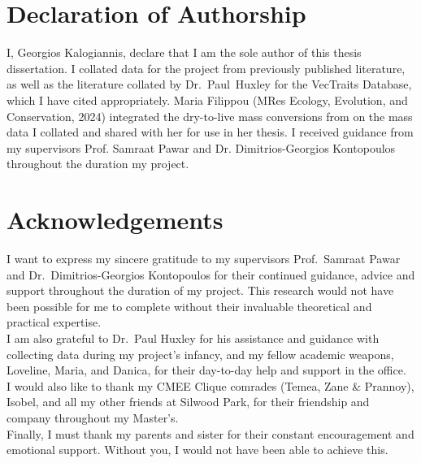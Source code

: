 \documentclass[11pt]{article}
\begin{document}
\section*{Declaration of Authorship}
I, Georgios Kalogiannis, declare that I am the sole author of this thesis dissertation. I collated data for the project from previously published literature, as well as the literature collated by Dr.~Paul~Huxley for the VecTraits Database, which I have cited appropriately. Maria Filippou (MRes Ecology, Evolution, and Conservation, 2024) integrated the dry-to-live mass conversions from \cite{drylivemass} on the mass data I collated and shared with her for use in her thesis. I received guidance from my supervisors Prof. Samraat Pawar and Dr. Dimitrios-Georgios Kontopoulos throughout the duration my project.
\pagebreak


\section*{Acknowledgements}
I want to express my sincere gratitude to my supervisors Prof.~Samraat Pawar and Dr.~Dimitrios-Georgios Kontopoulos for their continued guidance, advice and support throughout the duration of my project. This research would not have been possible for me to complete without their invaluable theoretical and practical expertise. \\

\noindent I am also grateful to Dr.~Paul Huxley for his assistance and guidance with collecting data during my project's infancy, and my fellow academic weapons, Loveline, Maria, and Danica, for their day-to-day help and support in the office. \\

\noindent I would also like to thank my CMEE Clique comrades (Temea, Zane \& Prannoy), Isobel, and all my other friends at Silwood Park, for their friendship and company throughout my Master's.\\

\noindent Finally, I must thank my parents and sister for their constant encouragement and emotional support. Without you, I would not have been able to achieve this.

\pagebreak

\end{document}
